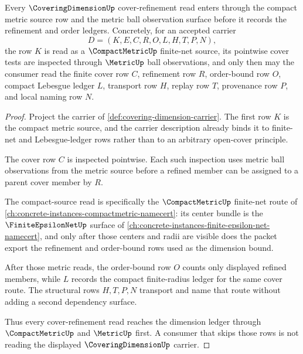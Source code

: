 \begin{theorem}
\label{thm:covering-dimension-metric-dependency}
Every $\CoveringDimensionUp$ cover-refinement read enters through the compact metric source row and the metric ball observation surface before it records the refinement and order ledgers. Concretely, for an accepted carrier
$$
D=(K,E,C,R,O,L,H,T,P,N),
$$
the row $K$ is read as a $\CompactMetricUp$ finite-net source, its pointwise cover tests are inspected through $\MetricUp$ ball observations, and only then may the consumer read the finite cover row $C$, refinement row $R$, order-bound row $O$, compact Lebesgue ledger $L$, transport row $H$, replay row $T$, provenance row $P$, and local naming row $N$.
\end{theorem}
\begin{proof}
Project the carrier of \autoref{def:covering-dimension-carrier}. The first row $K$ is the compact metric source, and the carrier description already binds it to finite-net and Lebesgue-ledger rows rather than to an arbitrary open-cover principle.

The cover row $C$ is inspected pointwise. Each such inspection uses metric ball observations from the metric source before a refined member can be assigned to a parent cover member by $R$.

The compact-source read is specifically the $\CompactMetricUp$ finite-net route of \autoref{ch:concrete-instances-compactmetric-namecert}: its center bundle is the $\FiniteEpsilonNetUp$ surface of \autoref{ch:concrete-instances-finite-epsilon-net-namecert}, and only after those centers and radii are visible does the packet export the refinement and order-bound rows used as the dimension bound.

After those metric reads, the order-bound row $O$ counts only displayed refined members, while $L$ records the compact finite-radius ledger for the same cover route. The structural rows $H,T,P,N$ transport and name that route without adding a second dependency surface.

Thus every cover-refinement read reaches the dimension ledger through $\CompactMetricUp$ and $\MetricUp$ first. A consumer that skips those rows is not reading the displayed $\CoveringDimensionUp$ carrier.
\end{proof}
